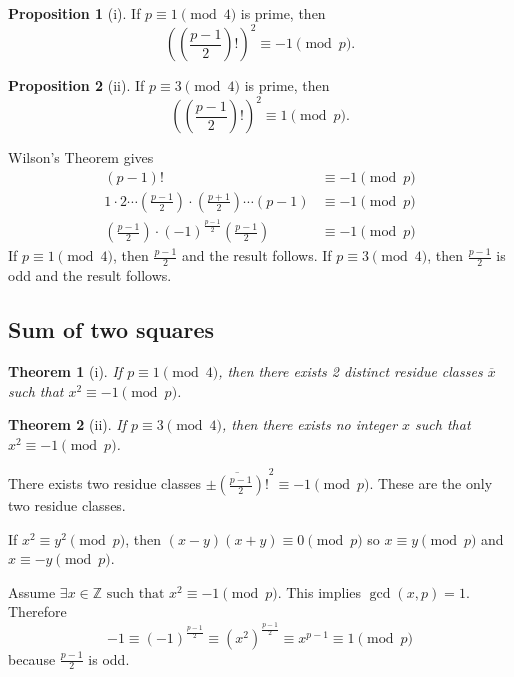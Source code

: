 \documentclass[11pt]{article}
\newtheorem{thm}{Theorem}[section]
\theoremstyle{definition}
\newtheorem{prop}{Proposition}[section]
\newcommand{\st}[0]{\text{ such that }}
\newcommand{\ZZ}{\mathbb{Z}}
\begin{document}

\begin{prop}[i]
	If $p\equiv 1 \pmod{4}$ is prime, then 
		$$ \left(\left(\frac{p-1}{2}\right)!\right)^2 \equiv -1 \pmod{p}. $$
\end{prop}
\begin{prop}[ii] 
	If $p\equiv 3 \pmod{4}$ is prime, then 
		$$ \left(\left(\frac{p-1}{2}\right)!\right)^2 \equiv 1 \pmod{p}. $$
\end{prop}

\proof Wilson's Theorem gives 
	\begin{align*}
		(p-1)! &\equiv -1 \pmod{p} \\
		1\cdot2\cdots\left(\frac{p-1}{2}\right)\cdot\left(\frac{p+1}{2}\right)\cdots(p-1) &\equiv -1 \pmod{p} \\
		\left(\frac{p-1}{2}\right) \cdot (-1)^{\frac{p-1}{2}}\left(\frac{p-1}{2}\right) &\equiv -1 \pmod{p}
	\end{align*}
	If $p\equiv1\pmod{4}$, then $\frac{p-1}{2}$ and the result follows. If $p\equiv3\pmod{4}$, then $\frac{p-1}{2}$ is odd and the result follows.
\qedhere

\subsection{Sum of two squares}

\begin{thm}[i]
	If $p\equiv 1 \pmod{4}$, then there exists 2 distinct residue classes $\overline{x}$ such that $x^2\equiv -1\pmod{p}$. 
\end{thm}
\begin{thm}[ii]
	If $p\equiv 3 \pmod{4}$, then there exists no integer $x$ such that $x^2\equiv -1 \pmod{p}$. 
\end{thm}

\proof[Proof of (i)] 
There exists two residue classes $\overline{\pm\left(\frac{p-1}{2}\right)!}^2 \equiv -1 \pmod{p}$. These are the only two residue classes.

If $x^2\equiv y^2 \pmod{p}$, then $(x-y)(x+y) \equiv 0 \pmod{p}$ so $x\equiv y \pmod{p}$ and $x\equiv -y \pmod{p}$. 
\qedhere

\proof[Proof of (ii)] 
Assume $\exists x\in\ZZ \st x^2 \equiv -1 \pmod{p}$. This implies $\gcd(x,p)=1$. Therefore $$ -1 \equiv (-1)^\frac{p-1}{2} \equiv (x^2)^\frac{p-1}{2} \equiv x^{p-1} \equiv 1 \pmod{p} $$ 
because $\frac{p-1}{2}$ is odd.
\qedhere
\end{document}

